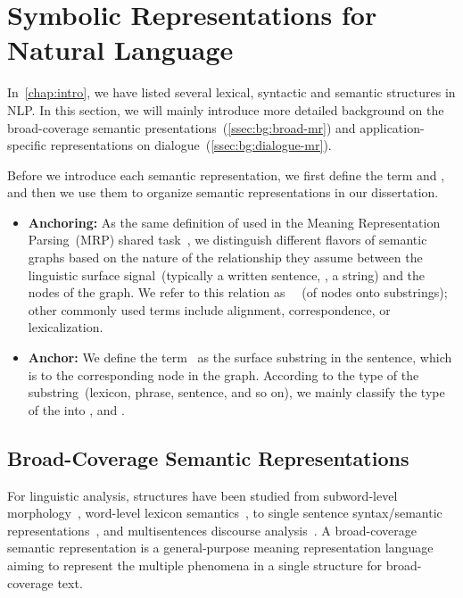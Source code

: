 \section[Symbolic Representations for Natural Language]{Symbolic Representations for \\Natural Language}
\label{sec:bg:symbolic}

In~\autoref{chap:intro}, we have listed several lexical, syntactic and
semantic structures in NLP. In this section, we will mainly introduce
more detailed background on the broad-coverage semantic
presentations~(\autoref{ssec:bg:broad-mr}) and application-specific
representations on dialogue~(\autoref{ssec:bg:dialogue-mr}).

Before we introduce each semantic representation, we first define the
term  and , and then we use them to organize
semantic representations in our dissertation.

\begin{itemize}
\item \textbf{Anchoring:} As the same definition of 
  used in the Meaning Representation Parsing~(MRP) shared
  task~\citep{Oep:Abe:Haj:19}, we distinguish different flavors of
  semantic graphs based on the nature of the relationship they assume
  between the linguistic surface signal~(typically a written sentence,
  \ie, a string) and the nodes of the graph. We refer to this relation
  as ~~(of nodes onto substrings); other commonly used
  terms include alignment, correspondence, or lexicalization.

\item \textbf{Anchor:} We define the term~ as the surface
  substring in the sentence, which is  to the
  corresponding node in the graph. According to the type of the
  substring~(lexicon, phrase, sentence, and so on), we mainly classify
  the type of the  into ,
   and .
\end{itemize}

\subsection{Broad-Coverage Semantic Representations}
\label{ssec:bg:broad-mr}

For linguistic analysis, structures have been studied from
subword-level morphology~\citep{beesley2003finite}, word-level lexicon
semantics~\citep{miller1998wordnet}, to single sentence
syntax/semantic
representations~\citep{baker1998berkeley,palmer2005proposition,collins2003head},
and multisentences discourse
analysis~\citep{carlson-etal-2001-building,wolf2005representing,prasad2008penn}. A
broad-coverage semantic representation is a general-purpose meaning
representation language aiming to represent the multiple phenomena in
a single structure for broad-coverage text.

